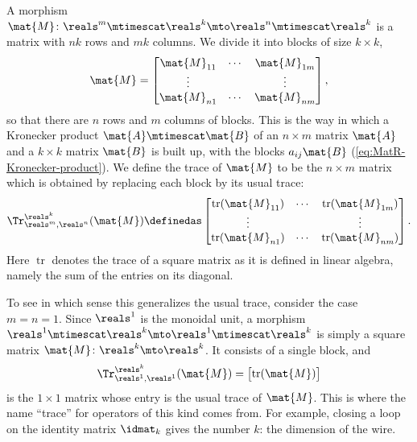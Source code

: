 A morphism $\mat{M} \colon \reals^m \mtimescat \reals^k \mto \reals^n \mtimescat \reals^k$ is a matrix with $nk$ rows and $mk$ columns.
We divide it into blocks of size $k \times k$,
\begin{equation}
    \label{eq:MatR-Kronecker-blocks}
    \mat{M} =
    \begin{bmatrix}
        \mat{M}_{11} & \cdots & \mat{M}_{1m} \\
        \vdots       &        & \vdots       \\
        \mat{M}_{n1} & \cdots & \mat{M}_{nm}
    \end{bmatrix},
\end{equation}
so that there are $n$ rows and $m$ columns of blocks.
This is the way in which a Kronecker product $\mat{A} \mtimescat \mat{B}$ of an $n \times m$ matrix $\mat{A}$ and a $k \times k$ matrix $\mat{B}$ is built up, with the blocks $a_{ij}\mat{B}$ (\cref{eq:MatR-Kronecker-product}).
We define the trace of $\mat{M}$ to be the $n \times m$ matrix which is obtained by replacing each block by its usual trace:
\begin{equation}
    \label{eq:MatR-Kronecker-trace}
    \Tr_{\reals^m,\reals^n}^{\reals^k}(\mat{M}) \definedas
    \begin{bmatrix}
        \operatorname{tr}(\mat{M}_{11}) & \cdots & \operatorname{tr}(\mat{M}_{1m}) \\
        \vdots                          &        & \vdots                          \\
        \operatorname{tr}(\mat{M}_{n1}) & \cdots & \operatorname{tr}(\mat{M}_{nm})
    \end{bmatrix}.
\end{equation}
Here $\operatorname{tr}$ denotes the trace of a square matrix as it is defined in linear algebra, namely the sum of the entries on its diagonal.

To see in which sense this generalizes the usual trace, consider the case $m = n = 1$.
Since $\reals^1$ is the monoidal unit, a morphism $\reals^1 \mtimescat \reals^k \mto \reals^1 \mtimescat \reals^k$ is simply a square matrix $\mat{M} \colon \reals^k \mto \reals^k$.
It consists of a single block, and
\begin{equation}
    \Tr_{\reals^1,\reals^1}^{\reals^k}(\mat{M}) = \begin{bmatrix} \operatorname{tr}(\mat{M}) \end{bmatrix}
\end{equation}
is the $1 \times 1$ matrix whose entry is the usual trace of $\mat{M}$.
This is where the name ``trace'' for operators of this kind comes from.
For example, closing a loop on the identity matrix $\idmat_k$ gives the number $k$: the dimension of the wire.

